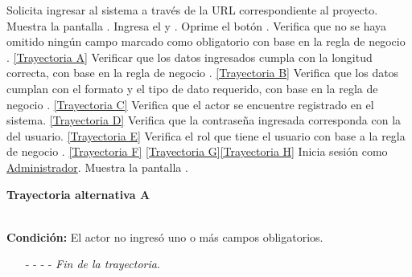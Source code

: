 	\begin{UCtrayectoria}
		\UCpaso[\UCactor] Solicita ingresar al sistema a través de la URL correspondiente al proyecto.
		\UCpaso[\UCsist] Muestra la pantalla .
		\UCpaso[\UCactor] Ingresa el  y . \label{P3}
		\UCpaso[\UCactor] Oprime el botón .
		\UCpaso[\UCsist] Verifica que no se haya omitido ningún campo marcado como obligatorio con base en la regla de negocio . \hyperlink{CU1:TAA}{[Trayectoria A]}
		\UCpaso[\UCsist] Verificar que los datos ingresados cumpla con la longitud correcta, con base en la regla de negocio . \hyperlink{CU1:TAB}{[Trayectoria B]}
		\UCpaso[\UCsist] Verifica que los datos cumplan con el formato y el tipo de dato requerido, con base en la regla de negocio . \hyperlink{CU1:TAC}{[Trayectoria C]}
		\UCpaso[\UCsist] Verifica que el actor se encuentre registrado en el sistema. \hyperlink{CU1:TAD}{[Trayectoria D]}
		\UCpaso[\UCsist] Verifica que la contraseña ingresada corresponda con la del usuario. \hyperlink{CU1:TAE}{[Trayectoria E]}
		\UCpaso[\UCsist] Verifica el rol que tiene el usuario con base a la regla de negocio . \hyperlink{CU1:TAF}{[Trayectoria F]} \hyperlink{CU1:TAG}{[Trayectoria G]}\hyperlink{CU1:TAH}{[Trayectoria H]}
		\UCpaso[\UCsist] Inicia sesión como \hyperlink{admin}{Administrador}.
		\UCpaso[\UCsist] Muestra la pantalla .
	\end{UCtrayectoria}		
		\hypertarget{CU1:TAA}{\textbf{Trayectoria alternativa A}}\\
		\noindent \textbf{Condición:} El actor no ingresó uno o más campos obligatorios.
		\begin{enumerate}
			\UCpaso[\UCsist] Muestra el mensaje  y señala el campo que presenta el error en la pantalla .
			\UCpaso[\UCactor] Regresa al paso \ref{P3} de la Trayectoria Principal.
			\item[- -] - - {\em {Fin de la trayectoria}}.%
		\end{enumerate}


